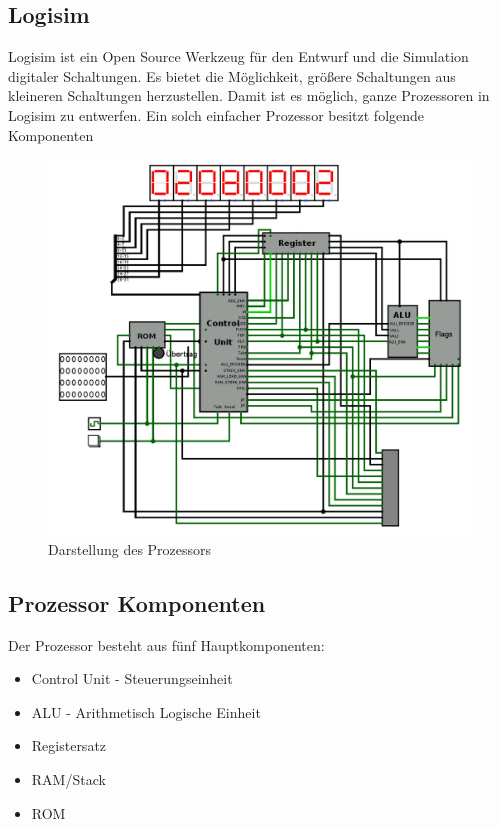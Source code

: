 \documentclass[12pt]{article}
\begin{document}
\subsection{Logisim}
Logisim ist ein Open Source Werkzeug für den Entwurf und die Simulation digitaler Schaltungen. Es bietet die Möglichkeit, größere Schaltungen aus kleineren Schaltungen herzustellen. Damit ist es möglich, ganze Prozessoren in Logisim zu entwerfen. Ein solch einfacher Prozessor besitzt folgende Komponenten 

\begin{figure}[!htb]
\centering
\includegraphics[scale=0.30]{cpu}
\caption{Darstellung des Prozessors}
\centering
\label{fig:register}
\end{figure}
\newpage



\subsection{Prozessor Komponenten}
Der Prozessor besteht aus fünf Hauptkomponenten:
\begin{itemize}
\item Control Unit - Steuerungseinheit
\item ALU - Arithmetisch Logische Einheit
\item Registersatz 
\item RAM/Stack
\item ROM
\end{itemize}
\end{document}
